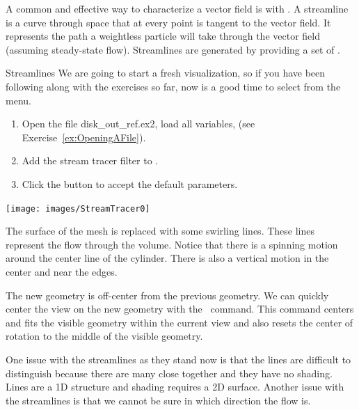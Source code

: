 A common and effective way to characterize a vector field is with
.  A streamline is a curve through space that at every
point is tangent to the vector field.  It represents the path a weightless
particle will take through the vector field (assuming steady-state flow).
Streamlines are generated by providing a set of
 .

\begin{exercise}{Streamlines}
  \label{ex:Streamlines}%
  We are going to start a fresh visualization, so if you have been
  following along with the exercises so far, now is a good time to select
   \ra {} from the menu.

  \begin{enumerate}
  \item Open the file disk\_out\_ref.ex2, load all variables, \apply (see
    Exercise~\ref{ex:OpeningAFile}).
  \item Add the stream tracer filter \streamTracer to
    .
  \item Click the \apply button to accept the default parameters.
  \end{enumerate}

  \begin{inlinefig}
    \texttt{[image: images/StreamTracer0]}
  \end{inlinefig}

  The surface of the mesh is replaced with some swirling lines.  These
  lines represent the flow through the volume.  Notice that there is a
  spinning motion around the center line of the cylinder.  There is also a
  vertical motion in the center and near the edges.

  The new geometry is off-center from the previous geometry.  We can
  quickly center the view on the new geometry with the ~\resetCamera command.  This command centers and fits the
  visible geometry within the current view and also resets the center of
  rotation to the middle of the visible geometry.
\end{exercise}

One issue with the streamlines as they stand now is that the lines are
difficult to distinguish because there are many close together and they
have no shading.  Lines are a 1D structure and shading requires a 2D
surface.  Another issue with the streamlines is that we cannot be sure in which
direction the flow is.

